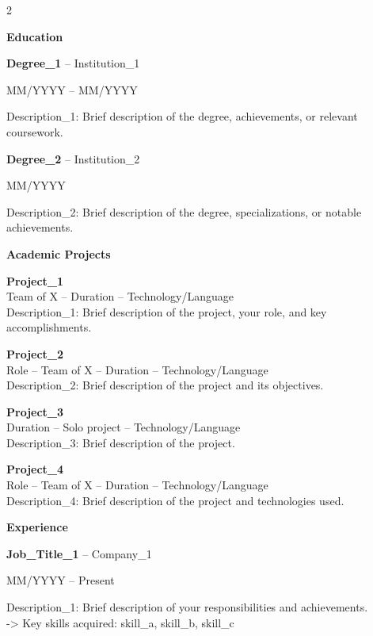 \documentclass[a4paper,10pt]{article}
\newcommand{\cvsection}[1]{%
    \vspace{1.2em}
    {\color{primary}\large\bfseries #1}
    \vspace{0.6em}
    \par
}
\newcommand{\cvsubsection}[2]{%
    \textbf{#1} {\color{primary}-- #2}
    \par
}
\newcommand{\cvdate}[1]{%
    {\color{lightgray}\small #1}
    \par
}
\newcommand{\cvdesc}[1]{%
    {\color{darkgray}\small #1}
    \par
}
\begin{document}
\setlength{\columnsep}{1.5em}
\begin{paracol}{2}


\cvsection{Education}

\cvsubsection{Degree\_1}{Institution\_1}
\cvdate{MM/YYYY -- MM/YYYY}
\cvdesc{Description\_1: Brief description of the degree, achievements, or relevant coursework.}

\vspace{0.8em}
\cvsubsection{Degree\_2}{Institution\_2}
\cvdate{MM/YYYY}
\cvdesc{Description\_2: Brief description of the degree, specializations, or notable achievements.}

\cvsection{Academic Projects}

\textbf{Project\_1}\\
\cvdesc{Team of X -- Duration -- Technology/Language\\
Description\_1: Brief description of the project, your role, and key accomplishments.}

\vspace{0.8em}
\textbf{Project\_2}\\
\cvdesc{Role -- Team of X -- Duration -- Technology/Language\\
Description\_2: Brief description of the project and its objectives.}

\vspace{0.8em}
\textbf{Project\_3}\\
\cvdesc{Duration -- Solo project -- Technology/Language\\
Description\_3: Brief description of the project.}

\vspace{0.8em}
\textbf{Project\_4}\\
\cvdesc{Role -- Team of X -- Duration -- Technology/Language\\
Description\_4: Brief description of the project and technologies used.}

\cvsection{Experience}

\cvsubsection{Job\_Title\_1}{Company\_1}
\cvdate{MM/YYYY -- Present}
\cvdesc{Description\_1: Brief description of your responsibilities and achievements.\\
-> Key skills acquired: skill\_a, skill\_b, skill\_c}


\end{paracol}
\end{document}
